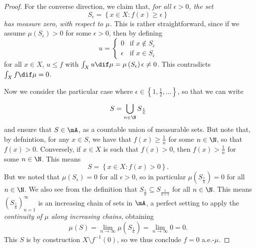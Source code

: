\documentclass[pmath450]{subfiles}
\begin{document}
\begin{proof}
        For the converse direction, we claim that, \textit{for all $\epsilon>0$, the set
            \begin{equation*}
                S_{\epsilon} = \left\lbrace x\in X: f\left( x \right)\geq\epsilon \right\rbrace
            \end{equation*}
        has measure zero, with respect to $\mu$.} This is rather straightforward, since if we assume $\mu\left( S_{\epsilon} \right)>0$ for some $\epsilon>0$, then by defining
        \begin{equation*}
            u =
            \begin{cases} 
                0 & \text{if $x\notin S_{\epsilon}$} \\
                \epsilon & \text{if $x\in S_{\epsilon}$}
            \end{cases}
        \end{equation*}
        for all $x\in X$, $u\leq f$ with $\int_Xu\dif\mu = \mu\left( S_{\epsilon} \right)\epsilon\neq 0$. This contradicts $\int_Xf\dif\mu = 0$.

        Now we consider the particular case where $\epsilon\in\left\lbrace 1,\frac{1}{2},\ldots \right\rbrace$, so that we can write
        \begin{equation*}
            S = \bigcup^{}_{n\in\N} S_{\frac{1}{n}}
        \end{equation*}
        and ensure that $S\in\mA$, as a countable union of measurable sets. But note that, by defnintion, for any $x\in S$, we have that $f\left( x \right)\geq \frac{1}{n}$ for some $n\in\N$, so that $f\left( x \right)>0$. Conversely, if $x\in X$ is such that $f\left( x \right)>0$, then $f\left( x \right)>\frac{1}{n}$ for some $n\in\N$. This means
        \begin{equation*}
            S = \left\lbrace x\in X: f\left( x \right)>0 \right\rbrace.
        \end{equation*}
        But we noted that $\mu\left( S_{\epsilon} \right)=0$ for all $\epsilon>0$, so in particular $\mu\left( S_{\frac{1}{n}} \right)=0$ for all $n\in\N$. We also see from the definition that $S_{\frac{1}{n}}\subseteq S_{\frac{1}{n+1}}$ for all $n\in\N$. This means $\left( S_{\frac{1}{n}} \right)^{\infty}_{n=1}$ is an increasing chain of sets in $\mA$, a perfect setting to apply the \textit{continuity of $\mu$ along increasing chains}, obtaining
        \begin{equation*}
            \mu\left( S \right) = \lim_{n\to\infty}\mu\left( S_{\frac{1}{n}} \right) = \lim_{n\to\infty} 0 = 0.
        \end{equation*}
        This $S$ is by construction $X\setminus f^{-1}\left( 0 \right)$, so we thus conclude $f=0$ a.e.-$\mu$.
    \end{proof}
\end{document}
